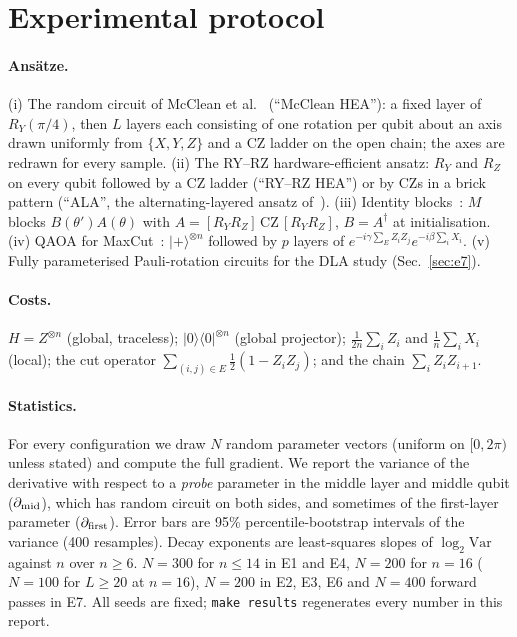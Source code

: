 \documentclass[11pt]{article}
\newcommand{\Var}{\mathrm{Var}}
\begin{document}
\section{Experimental protocol}
\label{sec:protocol}

\paragraph{Ans\"atze.}
(i) The random circuit of McClean et al.~\cite{mcclean2018} (``McClean HEA''): a fixed layer of $R_Y(\pi/4)$, then $L$ layers each consisting of one rotation per qubit about an axis drawn uniformly from $\{X,Y,Z\}$ and a CZ ladder on the open chain; the axes are redrawn for every sample. (ii) The RY--RZ hardware-efficient ansatz: $R_Y$ and $R_Z$ on every qubit followed by a CZ ladder (``RY--RZ HEA'') or by CZs in a brick pattern (``ALA'', the alternating-layered ansatz of~\cite{cerezo2021}). (iii) Identity blocks~\cite{grant2019}: $M$ blocks $B(\theta')A(\theta)$ with $A=[R_YR_Z]\,\mathrm{CZ}\,[R_YR_Z]$, $B=A^\dagger$ at initialisation. (iv) QAOA for MaxCut~\cite{farhi2014}: $|+\rangle^{\otimes n}$ followed by $p$ layers of $e^{-i\gamma\sum_E Z_iZ_j}e^{-i\beta\sum_i X_i}$. (v) Fully parameterised Pauli-rotation circuits for the DLA study (Sec.~\ref{sec:e7}).

\paragraph{Costs.}
$H=Z^{\otimes n}$ (global, traceless); $|0\rangle\langle0|^{\otimes n}$ (global projector); $\tfrac{1}{2n}\sum_iZ_i$ and $\tfrac1n\sum_iX_i$ (local); the cut operator $\sum_{(i,j)\in E}\tfrac12(1-Z_iZ_j)$; and the chain $\sum_iZ_iZ_{i+1}$.

\paragraph{Statistics.}
For every configuration we draw $N$ random parameter vectors (uniform on $[0,2\pi)$ unless stated) and compute the full gradient. We report the variance of the derivative with respect to a \emph{probe} parameter in the middle layer and middle qubit ($\partial_{\rm mid}$), which has random circuit on both sides, and sometimes of the first-layer parameter ($\partial_{\rm first}$). Error bars are 95\% percentile-bootstrap intervals of the variance (400 resamples). Decay exponents are least-squares slopes of $\log_2\Var$ against $n$ over $n\ge6$. $N=300$ for $n\le14$ in E1 and E4, $N=200$ for $n=16$ ($N=100$ for $L\ge20$ at $n=16$), $N=200$ in E2, E3, E6 and $N=400$ forward passes in E7. All seeds are fixed; \texttt{make results} regenerates every number in this report.
\end{document}
